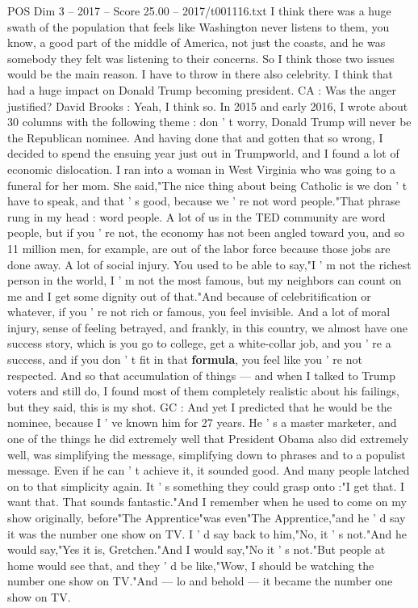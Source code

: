 \begin{textsample}{POS Dim 3 – 2017 – Score 25.00 – 2017/t001116.txt}
I think there was a huge swath of the population that feels like Washington never listens to them, you know, a good part of the middle of America, not just the coasts, and he was somebody they felt was listening to their concerns.
So I think those two issues would be the main reason.
I have to throw in there also celebrity.
I think that had a huge impact on Donald Trump becoming president.
CA : Was the anger justified?
David Brooks : Yeah, I think so.
In 2015 and early 2016, I wrote about 30 columns with the following theme : don ' t worry, Donald Trump will never be the Republican nominee.
And having done that and gotten that so wrong, I decided to spend the ensuing year just out in Trumpworld, and I found a lot of economic dislocation.
I ran into a woman in West Virginia who was going to a funeral for her mom.
She said,"The nice thing about being Catholic is we don ' t have to speak, and that ' s good, because we ' re not word people."That phrase rung in my head : word people.
A lot of us in the TED community are word people, but if you ' re not, the economy has not been angled toward you, and so 11 million men, for example, are out of the labor force because those jobs are done away.
A lot of social injury.
You used to be able to say,"I ' m not the richest person in the world, I ' m not the most famous, but my neighbors can count on me and I get some dignity out of that."And because of celebritification or whatever, if you ' re not rich or famous, you feel invisible.
And a lot of moral injury, sense of feeling betrayed, and frankly, in this country, we almost have one success story, which is you go to college, get a white-collar job, and you ' re a success, and if you don ' t fit in that \textbf{formula}, you feel like you ' re not respected.
And so that accumulation of things — and when I talked to Trump voters and still do, I found most of them completely realistic about his failings, but they said, this is my shot.
GC : And yet I predicted that he would be the nominee, because I ' ve known him for 27 years.
He ' s a master marketer, and one of the things he did extremely well that President Obama also did extremely well, was simplifying the message, simplifying down to phrases and to a populist message.
Even if he can ' t achieve it, it sounded good.
And many people latched on to that simplicity again.
It ' s something they could grasp onto :"I get that.
I want that.
That sounds fantastic."And I remember when he used to come on my show originally, before"The Apprentice"was even"The Apprentice,"and he ' d say it was the number one show on TV.
I ' d say back to him,"No, it ' s not."And he would say,"Yes it is, Gretchen."And I would say,"No it ' s not."But people at home would see that, and they ' d be like,"Wow, I should be watching the number one show on TV."And — lo and behold — it became the number one show on TV.

\end{textsample}
